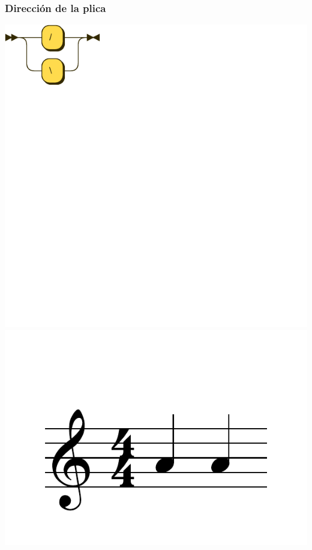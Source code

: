 \documentclass{article}
\begin{document}
\subsubsection{Dirección de la plica}

\includegraphics[scale=0.5]{figures_railroad/pdf/skern/stemDirection.pdf}
\includegraphics[scale=0.5]{figures_tests/pdf/skern/stemdirection0.pdf}
\end{document}
